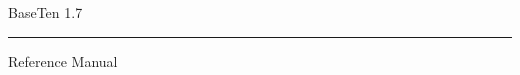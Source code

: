 \documentclass[a4paper]{book}
\begin{document}
\begin{titlepage}
\fontsize{40pt}{0pt}\selectfont
\vspace*{5cm}
\parbox{\columnwidth}{\raggedright{BaseTen 1.7}}
\rule{\columnwidth}{1pt}
\fontsize{18pt}{16pt}\selectfont
\parbox{\columnwidth}{\raggedright\hspace{1mm}Reference Manual}
\vfill
{}
\end{titlepage}

\clearemptydoublepage
{}
\tableofcontents
\clearemptydoublepage
{}
\end{document}
